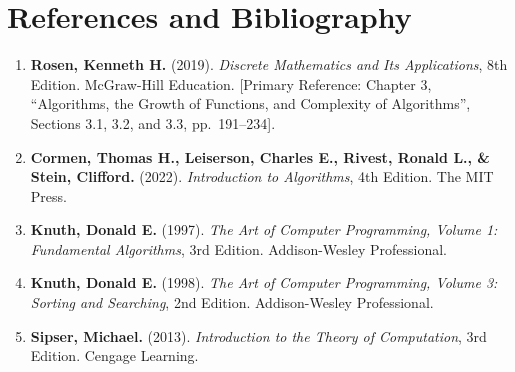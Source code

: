 \documentclass[10pt,a4paper]{article}
\theoremstyle{definition}
\begin{document}
\section{References and Bibliography}
\begin{enumerate}[leftmargin=*,itemsep=3pt,topsep=2pt]
    \item \textbf{Rosen, Kenneth H.} (2019). \textit{Discrete Mathematics and Its Applications}, 8th Edition. McGraw-Hill Education. [Primary Reference: Chapter 3, ``Algorithms, the Growth of Functions, and Complexity of Algorithms'', Sections 3.1, 3.2, and 3.3, pp.~191--234].
    \item \textbf{Cormen, Thomas H., Leiserson, Charles E., Rivest, Ronald L., \& Stein, Clifford.} (2022). \textit{Introduction to Algorithms}, 4th Edition. The MIT Press.
    \item \textbf{Knuth, Donald E.} (1997). \textit{The Art of Computer Programming, Volume 1: Fundamental Algorithms}, 3rd Edition. Addison-Wesley Professional.
    \item \textbf{Knuth, Donald E.} (1998). \textit{The Art of Computer Programming, Volume 3: Sorting and Searching}, 2nd Edition. Addison-Wesley Professional.
    \item \textbf{Sipser, Michael.} (2013). \textit{Introduction to the Theory of Computation}, 3rd Edition. Cengage Learning.
\end{enumerate}
\end{document}

